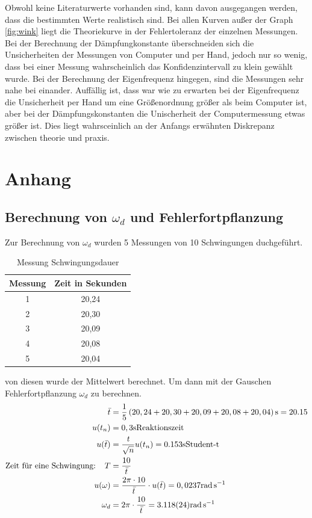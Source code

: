\documentclass[11pt, a4paper]{article}
\begin{document}
    Obwohl keine Literaturwerte vorhanden sind, kann davon ausgegangen werden, dass die bestimmten Werte realistisch sind.
    Bei allen Kurven außer der Graph \ref{fig:wink} liegt die Theoriekurve in der Fehlertoleranz der einzelnen Messungen.
    Bei der Berechnung der Dämpfungkonstante überschneiden sich die Unsicherheiten der Messungen von Computer und per Hand,
    jedoch nur so  wenig, dass bei einer Messung wahrscheinlich das Konfidenzintervall zu klein gewählt wurde. Bei der
    Berechnung der Eigenfrequenz hingegen, sind die Messungen sehr nahe bei einander. Auffällig ist, dass war wie zu
    erwarten bei der Eigenfrequenz die Unsicherheit per Hand um eine Größenordnung größer als beim Computer ist,
    aber bei der Dämpfungskonstanten die Unischerheit der Computermessung etwas größer ist. Dies liegt wahrsceinlich an der Anfangs
    erwähnten Diskrepanz zwischen theorie und praxis.

    \section{Anhang}

    \subsection{Berechnung von $\omega_d$ und Fehlerfortpflanzung}
    Zur Berechnung von $\omega_d$ wurden 5 Messungen von 10 Schwingungen duchgeführt.
    \begin{table}
        \centering
        \begin{tabular}{c c}
            Messung & Zeit in Sekunden \\ \hline
            1 & 20,24 \\
            2 & 20,30 \\
            3 & 20,09 \\
            4 & 20,08 \\
            5 & 20,04
        \end{tabular}
        \caption{Messung Schwingungsdauer}
        \label{Tab:messen}
    \end{table}
    von diesen wurde der Mittelwert berechnet. Um dann mit der Gauschen Fehlerfortpflanzung \cite[(19)]{ABW} $\omega_d$ zu berechnen.
    \begin{align}
        \bar{t} &= \frac{1}{5} \left(20,24 + 20,30 + 20,09 + 20,08 + 20,04 \right) \si{\second} = 20.15 \\
        u(t_n) &= 0,3 \si{\second} \text{Reaktionszeit} \\
        u(\bar{t}) &= \frac{{\it t}}{\sqrt{n}} u(t_n) = 0.153 \si{\second} \text{Student-t} \\
        \text{Zeit für eine Schwingung: } \ \ T &= \frac{10}{\bar{t}} \\
        u(\omega) &= \frac{2 \pi \cdot 10}{\bar{t}} \cdot u(\bar{t}) = 0,0237 \si{\radian\per\second} \\
        \omega_d &= 2 \pi \cdot \frac{10}{\bar{t}} = 3.118(24) \si{\radian\per\second}
    \end{align}


    
    
\end{document}
